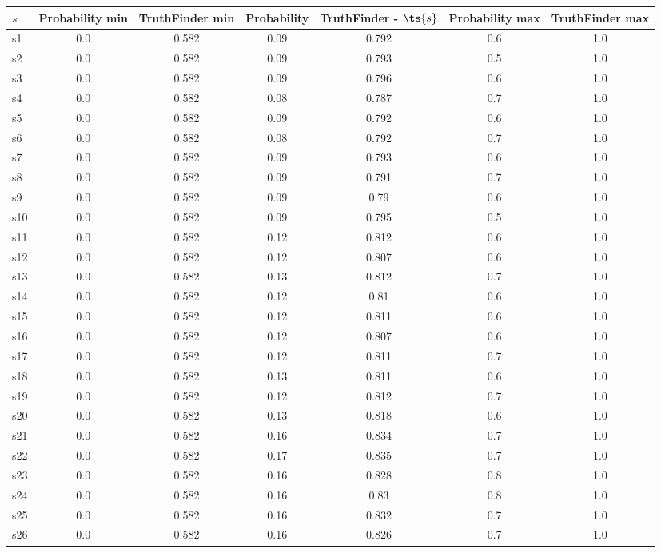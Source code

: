 \documentclass{article}
\begin{document}
\noindent\begin{tabular}{|l|c|c|c|c|c|c|}
\hline
$s$& Probability min & TruthFinder min & Probability & TruthFinder - $\ts{s}$ & Probability max & TruthFinder max\\
\hline
s1 &0.0 & 0.582 & 0.09 & 0.792 & 0.6 & 1.0\\
\hline
s2 &0.0 & 0.582 & 0.09 & 0.793 & 0.5 & 1.0\\
\hline
s3 &0.0 & 0.582 & 0.09 & 0.796 & 0.6 & 1.0\\
\hline
s4 &0.0 & 0.582 & 0.08 & 0.787 & 0.7 & 1.0\\
\hline
s5 &0.0 & 0.582 & 0.09 & 0.792 & 0.6 & 1.0\\
\hline
s6 &0.0 & 0.582 & 0.08 & 0.792 & 0.7 & 1.0\\
\hline
s7 &0.0 & 0.582 & 0.09 & 0.793 & 0.6 & 1.0\\
\hline
s8 &0.0 & 0.582 & 0.09 & 0.791 & 0.7 & 1.0\\
\hline
s9 &0.0 & 0.582 & 0.09 & 0.79 & 0.6 & 1.0\\
\hline
s10 &0.0 & 0.582 & 0.09 & 0.795 & 0.5 & 1.0\\
\hline
s11 &0.0 & 0.582 & 0.12 & 0.812 & 0.6 & 1.0\\
\hline
s12 &0.0 & 0.582 & 0.12 & 0.807 & 0.6 & 1.0\\
\hline
s13 &0.0 & 0.582 & 0.13 & 0.812 & 0.7 & 1.0\\
\hline
s14 &0.0 & 0.582 & 0.12 & 0.81 & 0.6 & 1.0\\
\hline
s15 &0.0 & 0.582 & 0.12 & 0.811 & 0.6 & 1.0\\
\hline
s16 &0.0 & 0.582 & 0.12 & 0.807 & 0.6 & 1.0\\
\hline
s17 &0.0 & 0.582 & 0.12 & 0.811 & 0.7 & 1.0\\
\hline
s18 &0.0 & 0.582 & 0.13 & 0.811 & 0.6 & 1.0\\
\hline
s19 &0.0 & 0.582 & 0.12 & 0.812 & 0.7 & 1.0\\
\hline
s20 &0.0 & 0.582 & 0.13 & 0.818 & 0.6 & 1.0\\
\hline
s21 &0.0 & 0.582 & 0.16 & 0.834 & 0.7 & 1.0\\
\hline
s22 &0.0 & 0.582 & 0.17 & 0.835 & 0.7 & 1.0\\
\hline
s23 &0.0 & 0.582 & 0.16 & 0.828 & 0.8 & 1.0\\
\hline
s24 &0.0 & 0.582 & 0.16 & 0.83 & 0.8 & 1.0\\
\hline
s25 &0.0 & 0.582 & 0.16 & 0.832 & 0.7 & 1.0\\
\hline
s26 &0.0 & 0.582 & 0.16 & 0.826 & 0.7 & 1.0\\

\end{tabular}
\end{document}
